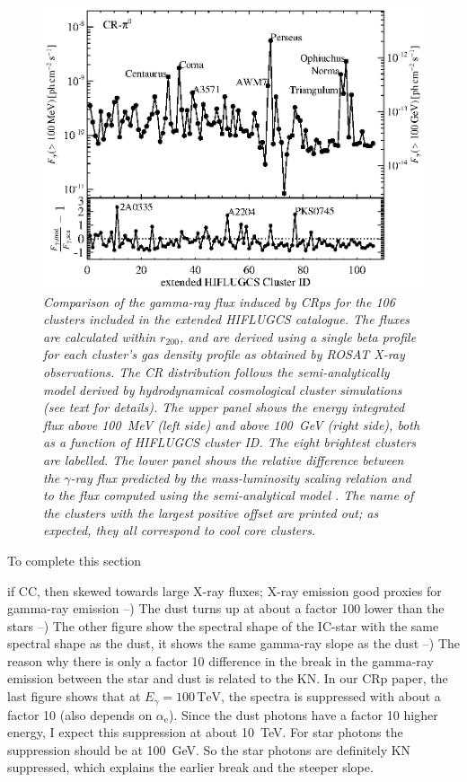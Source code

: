 \documentclass[10pt,aps,pra,reprint,amsmath,amsfonts,amssymb,showpacs]{revtex4-1}
\newcommand{\rmn}{\mathrm}
\newcommand{\tev}{\rmn{TeV}}
\newcommand{\rvir}{r_{200}}
\newcommand{\e}{\rmn{e}}
\newcommand{\eg}{E_\gamma}
\begin{document}
\begin{figure}%
\begin{minipage}{2.0\columnwidth}
 \includegraphics[width=0.99\columnwidth]{figures/Flux.comp.CR.eps}
 \caption{\it Comparison of the gamma-ray flux induced by CRps for the 106
   clusters included in the extended HIFLUGCS catalogue. The fluxes are
   calculated within $\rvir$, and are derived using a single beta profile for
   each cluster's gas density profile as obtained by ROSAT X-ray
   observations. The CR distribution follows the semi-analytically model derived
   by hydrodynamical cosmological cluster simulations \cite{2010MNRAS.409..449P}
   (see text for details). The upper panel shows the energy integrated flux
   above 100~MeV (left side) and above 100~GeV (right side), both as a function
   of HIFLUGCS cluster ID. The eight brightest clusters are labelled. The lower
   panel shows the relative difference between the $\gamma$-ray flux predicted by
   the mass-luminosity scaling relation and to the flux computed using the
   semi-analytical model \cite{2010MNRAS.409..449P}. The name of the clusters
   with the largest positive offset are printed out; as expected, they all
   correspond to cool core clusters.}
 \label{fig19}
\end{minipage}
\end{figure}

To complete this section

if CC, then skewed towards large X-ray fluxes; X-ray emission good
proxies for gamma-ray emission --) The dust turns up at about a factor
100 lower than the stars --) The other figure show the spectral shape
of the IC-star with the same spectral shape as the dust, it shows the
same gamma-ray slope as the dust --) The reason why there is only a
factor 10 difference in the break in the gamma-ray emission between
the star and dust is related to the KN. In our CRp paper, the last
figure shows that at $\eg=100\,\tev$, the spectra is suppressed with
about a factor 10 (also depends on $\alpha_\e$). Since the dust
photons have a factor 10 higher energy, I expect this suppression at
about 10~TeV. For star photons the suppression should be at
100~GeV. So the star photons are definitely KN suppressed, which
explains the earlier break and the steeper slope.
\end{document}
